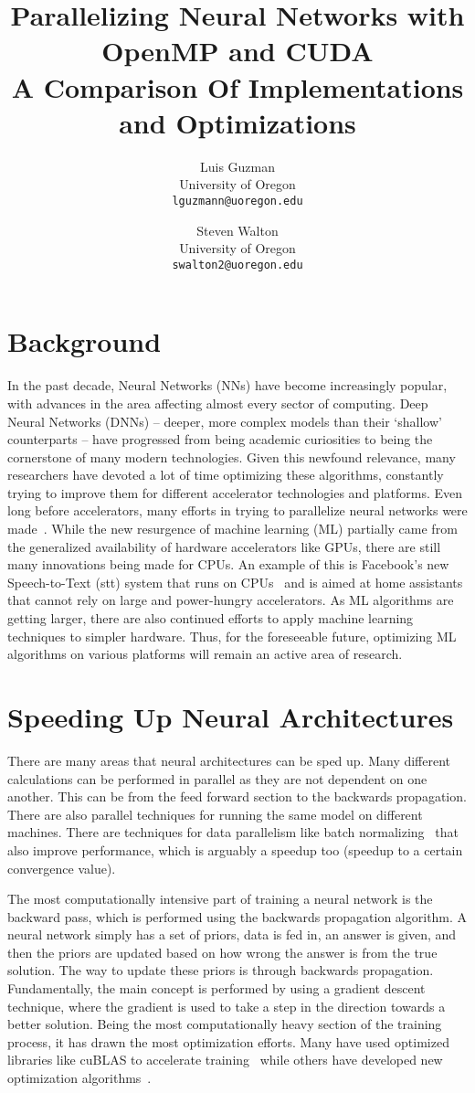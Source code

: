 \documentclass[10pt,twocolumn,letterpaper]{article}
\title{Parallelizing Neural Networks with OpenMP and CUDA\\
\small{A Comparison Of Implementations and Optimizations}}
\author{Luis Guzman\\
University of Oregon\\
{\tt\small lguzmann@uoregon.edu}
\and
Steven Walton\\
University of Oregon\\
{\tt\small swalton2@uoregon.edu}
}
\begin{document}
 
%
\maketitle 
%
\section{Background} 
%
In the past decade, Neural Networks (NNs) have become increasingly popular, with advances in the area affecting almost every sector of computing. Deep Neural Networks (DNNs) \--- deeper, more complex models than their `shallow' counterparts \--- have progressed from being academic curiosities to being the cornerstone of many modern technologies.
Given this newfound relevance, many researchers have devoted a lot of time optimizing these algorithms, constantly trying to improve them for different accelerator technologies and platforms. Even long before accelerators, many efforts in trying to parallelize neural networks were made~\cite{10.1007/BFb0024235}.
While the new resurgence of machine learning (ML) partially came from the generalized availability of hardware accelerators like GPUs, there are still many innovations being made for CPUs. An example of this is Facebook's new Speech-to-Text (stt) system that runs on CPUs~\cite{fbcpu} and is aimed at home assistants that cannot rely on large and power-hungry accelerators.
As ML algorithms are getting larger, there are also continued efforts to apply machine learning techniques to simpler hardware. Thus, for the foreseeable future, optimizing ML algorithms on various platforms will remain an active area of research.

\section{Speeding Up Neural Architectures}
%
There are many areas that neural architectures can be sped up. Many different
calculations can be performed in parallel as they are not dependent on one
another. This can be from the feed forward section to the backwards propagation.
There are also parallel techniques for running the same model on different
machines. There are techniques for data parallelism like batch 
normalizing~\cite{DBLP:journals/corr/IoffeS15} that also improve performance,
which is arguably a speedup too (speedup to a certain convergence value). 

The most computationally intensive part of training a neural network is the backward pass, which is performed using the backwards propagation algorithm.
A neural network simply has a set of priors, data is fed in, an answer is given, and then the priors are updated based on how wrong the answer is from the true solution.
The way to update these priors is through backwards propagation.
Fundamentally, the main concept is performed by using a gradient descent technique, where the gradient is used to take a step in the direction towards a better solution.
Being the most computationally heavy section of the training process, it has drawn the most optimization efforts.
Many have used optimized libraries like cuBLAS to accelerate training~\cite{5708849} while others have developed new optimization algorithms~\cite{DBLP:journals/corr/KingmaB14}.
\end{document}
